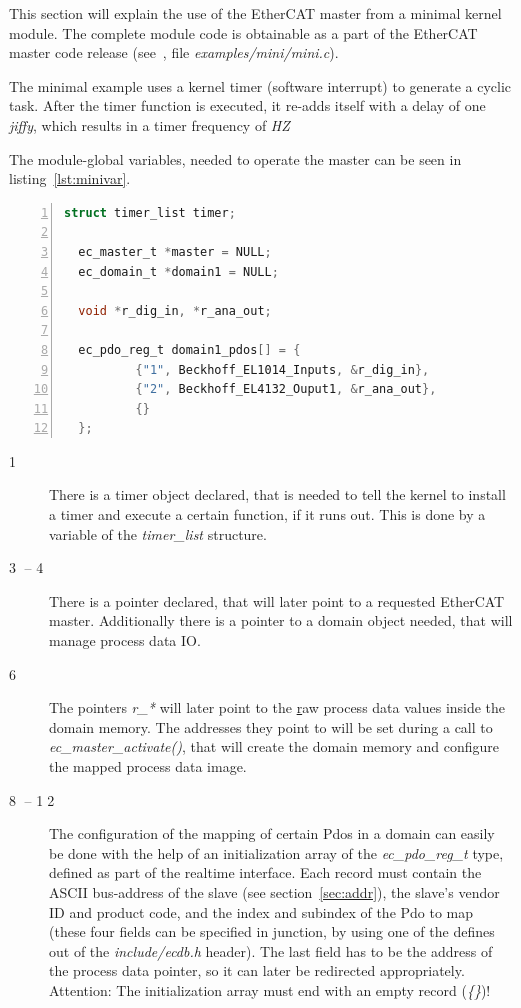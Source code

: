 \documentclass[a4paper,12pt,BCOR6mm,bibtotoc,idxtotoc]{scrbook}
\newcommand{\linenum}[1]{\normalfont\textcircled{\tiny #1}}
\begin{document}
This section will explain the use of the EtherCAT master from a minimal kernel
module. The complete module code is obtainable as a part of the EtherCAT master
code release (see~\cite{etherlab}, file \textit{examples/mini/mini.c}).

The minimal example uses a kernel timer (software interrupt) to generate a
cyclic task. After the timer function is executed, it re-adds itself with a
delay of one \textit{jiffy}, which results in a timer frequency
of \textit{HZ}

The module-global variables, needed to operate the master can be seen
in listing~\ref{lst:minivar}.

\begin{lstlisting}[gobble=2,language=C,numbers=left,caption={Minimal
    variables},label=lst:minivar]
  struct timer_list timer;

  ec_master_t *master = NULL;
  ec_domain_t *domain1 = NULL;

  void *r_dig_in, *r_ana_out;

  ec_pdo_reg_t domain1_pdos[] = {
          {"1", Beckhoff_EL1014_Inputs, &r_dig_in},
          {"2", Beckhoff_EL4132_Ouput1, &r_ana_out},
          {}
  };
\end{lstlisting}

\begin{description}
\item[\linenum{1}] There is a timer object
  declared, that is needed to tell the kernel to install a timer and
  execute a certain function, if it runs out. This is done by a
  variable of the \textit{timer\_list} structure.
\item[\linenum{3} -- \linenum{4}] There
  is a pointer declared, that will later point to a requested EtherCAT
  master.  Additionally there is a pointer to a domain object needed,
  that will manage process data IO.
\item[\linenum{6}] The pointers \textit{r\_*}
  will later point to the \underline{r}aw process data values inside
  the domain memory. The addresses they point to will be set during a
  call to \textit{ec\_\-master\_\-activate()}, that will create the
  domain memory and configure the mapped process data image.
\item[\linenum{8} -- \linenum{12}] The
  configuration of the mapping of certain Pdos in a domain can easily
  be done with the help of an initialization array of the
  \textit{ec\_pdo\_reg\_t} type, defined as part of the realtime
  interface. Each record must contain the ASCII bus-address of the
  slave (see section~\ref{sec:addr}), the slave's vendor ID and
  product code, and the index and subindex of the Pdo to map (these
  four fields can be specified in junction, by using one of the
  defines out of the \textit{include/ecdb.h} header). The last field
  has to be the address of the process data pointer, so it can later
  be redirected appropriately. Attention: The initialization array
  must end with an empty record (\textit{\{\}})!
\end{description}
\end{document}
